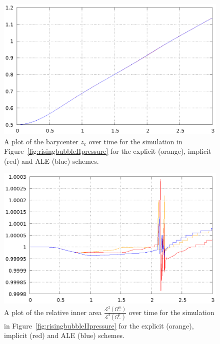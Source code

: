 \begin{figure}[htbp]
\centering
\includegraphics[width=.45\textwidth]
{figures/navier_stokes/rising_bubble_II_barycenter.ps}
\caption[Navier--Stokes rising bubble II barycenter]
{A plot of the barycenter $z_c$ over time for the simulation in
Figure~\ref{fig:risingbubbleIIpressure} for the explicit (orange), implicit
(red) and ALE (blue) schemes.}
\label{fig:risingbubbleIIbarycenter}
\end{figure}

\begin{figure}[htbp]
\centering
\includegraphics[width=.45\textwidth]
{figures/navier_stokes/rising_bubble_II_inner_volume.ps}
\caption[Navier--Stokes rising bubble II inner area]
{A plot of the relative inner area
$\frac{\mathcal{L}^2(\Omega^m_-)}{\mathcal{L}^2(\Omega^0_-)}$ over time for the
simulation in Figure~\ref{fig:risingbubbleIIpressure} for the explicit
(orange), implicit (red) and ALE (blue) schemes.}
\label{fig:risingbubbleIIinnervolume}
\end{figure}

